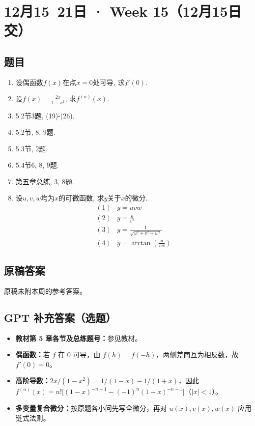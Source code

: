 \documentclass[UTF8,11pt, a4paper, oneside, fontset=none]{ctexbook}
\begin{document}
\section{12月15--21日 · Week 15（12月15日交）}
\subsection*{题目}
\begin{enumerate}

\item 设偶函数$f(x)$在点$x=0$处可导, 求$f'(0)$.

\item 设$f(x) = \frac{2x}{1-x^2}$, 求$f^{(n)}(x)$.

\item 5.2节3题, (19)-(26).

\item 5.2节, 8, 9题.

\item 5.3节, 2题.

\item 5.4节6, 8, 9题.

\item 第五章总练, 3, 8题.

\item 设$u, v, w$均为$x$的可微函数, 求$y$关于$x$的微分.
\begin{align*}
(1) & y = uvw\\
(2) & y = \frac{u}{v^2}\\
(3) & y = \frac{1}{\sqrt{u^2 + v^2 + w^2}}\\
(4) & y = \arctan \left( \frac{u}{vw} \right)
\end{align*}

\end{enumerate}
\clearpage
\subsection*{原稿答案}
\noindent 原稿未附本周的参考答案。
\clearpage
\subsection*{GPT 补充答案（选题）}
\begin{itemize}
\item \textbf{教材第 5 章各节及总练题号：}参见教材。
\item \textbf{偶函数：}若 $f$ 在 $0$ 可导，由 $f(h)=f(-h)$，两侧差商互为相反数，故 $f'(0)=0$。
\item \textbf{高阶导数：}$2x/(1-x^2)=1/(1-x)-1/(1+x)$，因此 $f^{(n)}(x)=n!\bigl[(1-x)^{-n-1}-(-1)^n(1+x)^{-n-1}\bigr]$（$|x|<1$）。
\item \textbf{多变量复合微分：}按原题各小问先写全微分，再对 $u(x),v(x),w(x)$ 应用链式法则。
\end{itemize}
\clearpage
\end{document}
